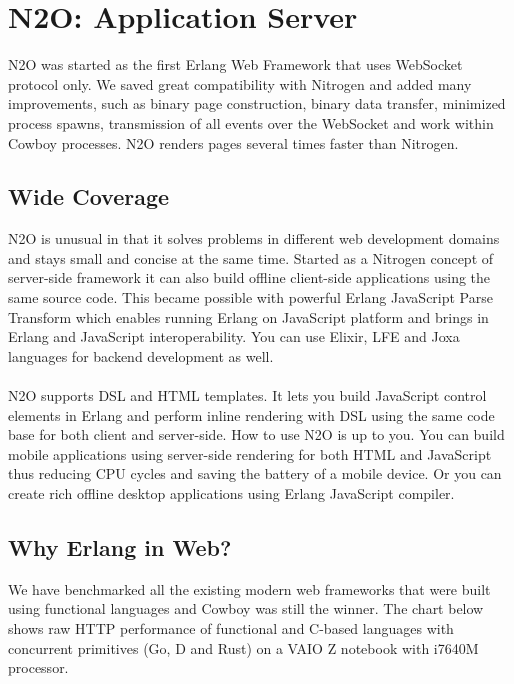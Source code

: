 \section{N2O: Application Server}

N2O was started as the first Erlang Web Framework
that uses WebSocket protocol only. We saved great compatibility with Nitrogen
and added many improvements, such as binary page construction,
binary data transfer, minimized process spawns, transmission of all events over the WebSocket
and work within Cowboy processes. N2O renders pages several times faster than Nitrogen.

\subsection{Wide Coverage}
N2O is unusual in that it solves problems in different web development domains
and stays small and concise at the same time. Started as a Nitrogen concept
of server-side framework it can also build offline client-side applications
using the same source code. This became possible with powerful Erlang JavaScript Parse
Transform which enables running Erlang on JavaScript platform and brings in Erlang and JavaScript
interoperability. You can use Elixir, LFE and Joxa languages for backend development as well.

\paragraph{}
N2O supports DSL and HTML templates. It lets you build JavaScript
control elements in Erlang and perform inline rendering with DSL using
the same code base for both client and server-side.
How to use N2O is up to you. You can build mobile applications using server-side rendering
for both HTML and JavaScript thus reducing CPU cycles and saving the battery of a mobile device.
Or you can create rich offline desktop applications using Erlang JavaScript compiler.

\newpage
\subsection*{Why Erlang in Web?}
We have benchmarked all the existing modern web frameworks that were built using functional
languages and Cowboy was still the winner. The chart below shows raw HTTP
performance of functional and C-based languages with concurrent
primitives (Go, D and Rust) on a VAIO Z notebook with i7640M processor.

